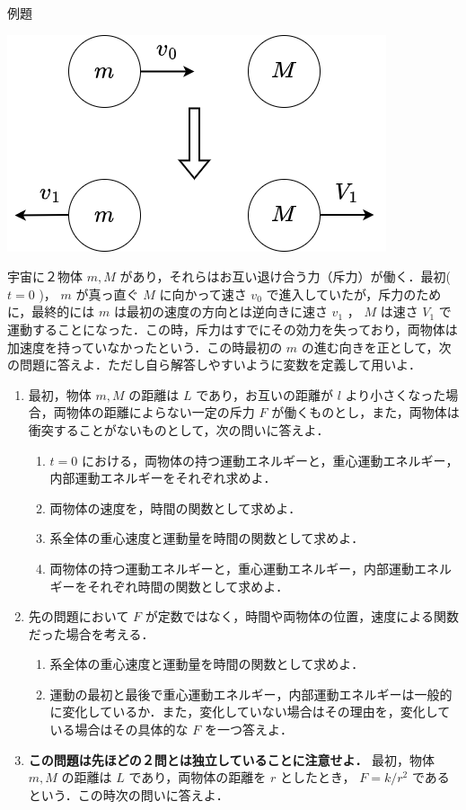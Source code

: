 \documentclass[
  b4paperpaper,
  xelatex,ja=standard]{bxjsbook}
\providecommand{\tightlist}{%
  \setlength{\itemsep}{0pt}\setlength{\parskip}{0pt}}\usepackage{longtable,booktabs,array}
\begin{document}
\begin{Rbox}{例題}

\includegraphics{source/images/energy/energy3.png}

宇宙に２物体 \(m,M\)
があり，それらはお互い退け合う力（斥力）が働く．最初( \(t=0\) )， \(m\)
が真っ直ぐ \(M\) に向かって速さ \(v_0\)
で進入していたが，斥力のために，最終的には \(m\)
は最初の速度の方向とは逆向きに速さ \(v_1\) ， \(M\) は速さ \(V_1\)
で運動することになった．この時，斥力はすでにその効力を失っており，両物体は加速度を持っていなかったという．この時最初の
\(m\)
の進む向きを正として，次の問題に答えよ．ただし自ら解答しやすいように変数を定義して用いよ．

\begin{enumerate}
\def\labelenumi{\arabic{enumi}.}
\item
  最初，物体 \(m,M\) の距離は \(L\) であり，お互いの距離が \(l\)
  より小さくなった場合，両物体の距離によらない一定の斥力 \(F\)
  が働くものとし，また，両物体は衝突することがないものとして，次の問いに答えよ．

  \begin{enumerate}
  \def\labelenumii{\arabic{enumii}.}
  \tightlist
  \item
    \(t=0\)
    における，両物体の持つ運動エネルギーと，重心運動エネルギー，内部運動エネルギーをそれぞれ求めよ．
  \item
    両物体の速度を，時間の関数として求めよ．
  \item
    系全体の重心速度と運動量を時間の関数として求めよ．
  \item
    両物体の持つ運動エネルギーと，重心運動エネルギー，内部運動エネルギーをそれぞれ時間の関数として求めよ．
  \end{enumerate}
\item
  先の問題において \(F\)
  が定数ではなく，時間や両物体の位置，速度による関数だった場合を考える．

  \begin{enumerate}
  \def\labelenumii{\arabic{enumii}.}
  \tightlist
  \item
    系全体の重心速度と運動量を時間の関数として求めよ．
  \item
    運動の最初と最後で重心運動エネルギー，内部運動エネルギーは一般的に変化しているか．また，変化していない場合はその理由を，変化している場合はその具体的な
    \(F\) を一つ答えよ．
  \end{enumerate}
\item
  \textbf{この問題は先ほどの２問とは独立していることに注意せよ．}
  最初，物体 \(m,M\) の距離は \(L\) であり，両物体の距離を \(r\)
  としたとき， \(F=k/r^2\) であるという．この時次の問いに答えよ．


\end{enumerate}
\end{Rbox}
\end{document}
